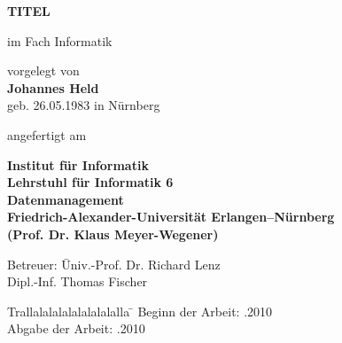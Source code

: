 \begin{titlepage}
  
  \begin{center}
    
    {\Huge \bf
      TITEL
    } 
    
    \vspace*{1cm}
    \thethesis im Fach Informatik
    \vspace{2cm}
    
    {\large vorgelegt von} \\
    \vspace*{0.7cm}
    {\Large \bf Johannes Held} \\
    \vspace*{0.7cm}
    {\large geb. 26.05.1983 in Nürnberg} 
    
    \vspace{2cm}
    
    angefertigt am 

    \vspace{1cm}
    
    {\bf 
      Institut für Informatik \\
      Lehrstuhl für Informatik 6\\
      Datenmanagement \\
      Friedrich-Alexander-Universität Erlangen--Nürnberg \\
      (Prof. Dr. Klaus Meyer-Wegener)
      }
    
    \vspace{1cm}
\end{center}
\begin{tabbing}
    Betreuer: \= Univ.-Prof. Dr. Richard Lenz \\
    \> Dipl.-Inf. Thomas Fischer 
\end{tabbing}
    \vspace{1cm}
    
    
\begin{tabbing}
	Trallalalalalalalalalalla \= \kill
	Beginn der Arbeit:   .2010 \\
  Abgabe der Arbeit:   .2010
\end{tabbing}
    
  
\end{titlepage}

\clearpage{\pagestyle{empty}\cleardoublepage}
